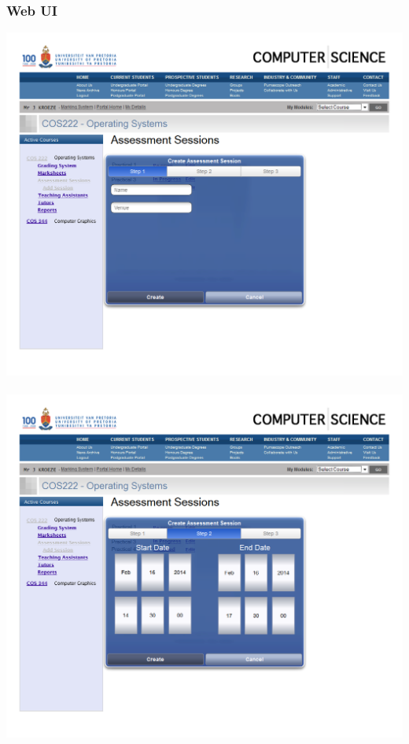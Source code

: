 \documentclass[12pt,a4paper]{article}
\begin{document}
\subsubsection{Web UI}
\includegraphics[scale=0.3]{./WebUI/1.png} \\\\
\includegraphics[scale=0.3]{./WebUI/2.png}\\\\
\end{document}
